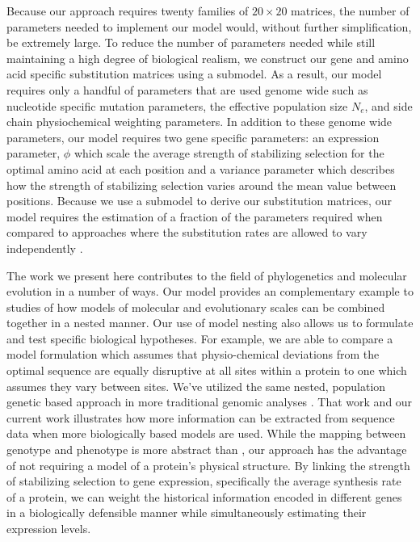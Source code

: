 \documentclass{article}
\newcommand{\Ne}{\ensuremath{{N_e}}\xspace} %
\begin{document}
Because our approach requires twenty families of $20 \times 20$ matrices, the number of parameters needed to implement our model would, without further simplification, be extremely large.
To reduce the number of parameters needed while still maintaining a high degree of biological realism, we construct our gene and amino acid specific substitution matrices using a submodel.
As a result, our model requires only a handful of parameters that are used genome wide such as nucleotide specific mutation parameters, the effective population size \Ne, and side chain physiochemical weighting parameters.
In addition to these genome wide parameters, our model requires two gene specific parameters: an expression parameter, $\phi$ which scale the average strength of stabilizing selection for the optimal amino acid at each position and a variance parameter which describes how the strength of stabilizing selection varies around the mean value between positions.
Because we use a submodel to derive our substitution matrices, our model requires the estimation of a fraction of the parameters required when compared to approaches where the substitution rates are allowed to vary independently  \citep{HalpernAndBruno1998,LartillotAndPhilippe2004,RodrigueAndLartillot2014}.


The work we present here contributes to the field of phylogenetics and molecular evolution in a number of ways.
Our model provides an complementary example to \citet{ThorneEtAl2012} studies of how models of molecular and evolutionary scales can be combined together in a nested manner.
Our use of model nesting also allows us to formulate and test specific biological hypotheses.
For example, we are able to compare a model formulation which assumes that physio-chemical deviations from the optimal sequence are equally disruptive at all sites within a protein to one which assumes they vary between sites.
We've utilized the same nested, population genetic based approach in more traditional genomic analyses \citep[e.g.][]{Gilchrist2007,ShahAndGilchrist2011,GilchristEtAl2015}.
That work and our current work illustrates how more information can be extracted from sequence data when more biologically based models are used.
While the mapping between genotype and phenotype is more abstract than \citet{ThorneEtAl2012}, our approach has the advantage of not requiring a model of a protein's physical structure.
By linking the strength of stabilizing selection to gene expression, specifically the average synthesis rate of a protein, we can weight the historical information encoded in different genes in a biologically defensible manner while simultaneously estimating their expression levels.
\end{document}
